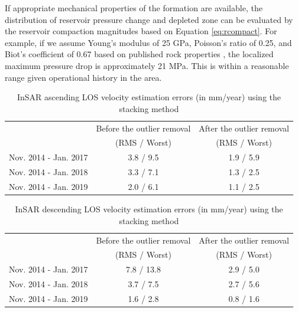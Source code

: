 \documentclass[draft,grl]{agutexSI2019}
\begin{document}
\begin{article}
If appropriate mechanical properties of the formation are available, the distribution of reservoir pressure change and depleted zone can be evaluated by the reservoir compaction magnitudes based on Equation \eqref{eq:rcompact}. For example, if we assume Young’s modulus of 25 GPa, Poisson’s ratio of 0.25, and Biot’s coefficient of 0.67 based on published rock properties \cite{Shukla2013, Xu2015analysis}, the localized maximum pressure drop is approximately 21 MPa. This is within a reasonable range given operational history in the area.

\begin{table}
\caption{InSAR ascending LOS velocity estimation errors (in mm/year) using the stacking method}
\centering
\begin{tabular}{|c|c|c|}
\hline 
      & Before the outlier removal & After the outlier removal \\
      & (RMS / Worst) & (RMS / Worst) \\
      \hline
Nov. 2014 - Jan. 2017 & 3.8 / 9.5         & 1.9 / 5.9       \\\hline
Nov. 2014 - Jan. 2018 & 3.3 / 7.1         & 1.3 / 2.5       \\\hline
Nov. 2014 - Jan. 2019 & 2.0 / 6.1         & 1.1 / 2.5       \\\hline                
\end{tabular}
\label{tab:gps-error-78}
\end{table}

\begin{table}
\caption{InSAR descending LOS velocity estimation errors (in mm/year) using the stacking method}
\begin{tabular}{|c|c|c|}
\hline 
      & Before the outlier removal & After the outlier removal \\
      & (RMS / Worst) & (RMS / Worst) \\
      \hline 
Nov. 2014 - Jan. 2017 & 7.8 / 13.8                            & 2.9 / 5.0                          \\\hline
Nov. 2014 - Jan. 2018 & 3.7 / 7.5                             & 2.7 / 5.6                          \\\hline
Nov. 2014 - Jan. 2019 & 1.6 / 2.8                             & 0.8 / 1.6  \\\hline     
\end{tabular}
\label{tab:gps-error-85}
\end{table}


\end{article}
\end{document}
